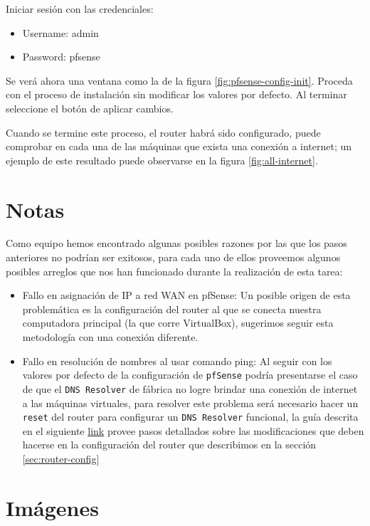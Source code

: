 \documentclass{article}
\begin{document}
            Iniciar sesión con las credenciales:
            \begin{itemize}
                \item Username: admin
                \item Password: pfsense
            \end{itemize}

            Se verá ahora una ventana como la de la figura \ref{fig:pfsense-config-init}. Proceda con el proceso de instalación sin modificar los valores por defecto. Al terminar seleccione el botón de aplicar cambios.

            Cuando se termine este proceso, el router habrá sido configurado, puede comprobar en cada una de las máquinas que exista una conexión a internet; un ejemplo de este resultado puede observarse en la figura \ref{fig:all-internet}.

    \section{Notas}

        Como equipo hemos encontrado algunas posibles razones por las que los pasos anteriores no podrían ser exitosos, para cada uno de ellos proveemos algunos posibles arreglos que nos han funcionado durante la realización de esta tarea:
        \begin{itemize}
            \item Fallo en asignación de IP a red WAN en pfSense: Un posible origen de esta problemática es la configuración del router al que se conecta nuestra computadora principal (la que corre VirtualBox), sugerimos seguir esta metodología con una conexión diferente.
            \item Fallo en resolución de nombres al usar comando ping: Al seguir con los valores por defecto de la configuración de \texttt{pfSense} podría presentarse el caso de que el \texttt{DNS Resolver} de fábrica no logre brindar una conexión de internet a las máquinas virtuales, para resolver este problema será necesario hacer un \texttt{reset} del router para configurar un \texttt{DNS Resolver} funcional, la guía descrita en el siguiente \href{https://coygeek.com/docs/pfsense-virtualbox/}{link} provee pasos detallados sobre las modificaciones que deben hacerse en la configuración del router que describimos en la sección \ref{sec:router-config}
        \end{itemize}
    
    \section{Imágenes}
\end{document}
